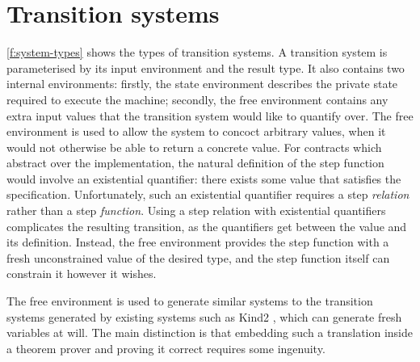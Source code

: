 
\section{Transition systems}
\label{s:transition}


\autoref{f:system-types} shows the types of transition systems.
A transition system is parameterised by its input environment and the result type.
It also contains two internal environments: firstly, the state environment describes the private state required to execute the machine; secondly, the free environment contains any extra input values that the transition system would like to quantify over.
The free environment is used to allow the system to concoct arbitrary values, when it would not otherwise be able to return a concrete value.
For contracts which abstract over the implementation, the natural definition of the step function would involve an existential quantifier: there exists some value that satisfies the specification.
Unfortunately, such an existential quantifier requires a step \emph{relation} rather than a step \emph{function}.
Using a step relation with existential quantifiers complicates the resulting transition, as the quantifiers get between the value and its definition.
Instead, the free environment provides the step function with a fresh unconstrained value of the desired type, and the step function itself can constrain it however it wishes.

The free environment is used to generate similar systems to the transition systems generated by existing systems such as Kind2 \cite{champion2016kind2}, which can generate fresh variables at will.
The main distinction is that embedding such a translation inside a theorem prover and proving it correct requires some ingenuity.



